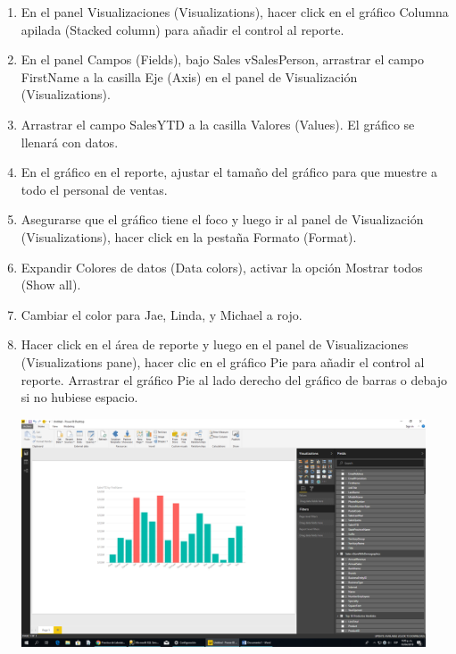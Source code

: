 \begin{itemize}
\begin{enumerate}
\item  En el panel Visualizaciones (Visualizations), hacer click en el gráfico Columna apilada (Stacked column) para
añadir el control al reporte.
\item  En el panel Campos (Fields), bajo Sales vSalesPerson, arrastrar el campo FirstName a la casilla Eje (Axis) en el
panel de Visualización (Visualizations).
\item  Arrastrar el campo SalesYTD a la casilla Valores (Values). El gráfico se llenará con datos.
\item  En el gráfico en el reporte, ajustar el tamaño del gráfico para que muestre a todo el personal de ventas.
\item  Asegurarse que el gráfico tiene el foco y luego ir al panel de Visualización (Visualizations), hacer click en la
pestaña Formato (Format).
\item  Expandir Colores de datos (Data colors), activar la opción Mostrar todos (Show all).
\item  Cambiar el color para Jae, Linda, y Michael a rojo.
\item  Hacer click en el área de reporte y luego en el panel de Visualizaciones (Visualizations pane), hacer clic en el
gráfico Pie para añadir el control al reporte. Arrastrar el gráfico Pie al lado derecho del gráfico de barras o
debajo si no hubiese espacio. 
\begin{center}
\includegraphics[width=12cm]{./Imagenes/11.png} 
\end{center}


\end{enumerate}
\end{itemize}
